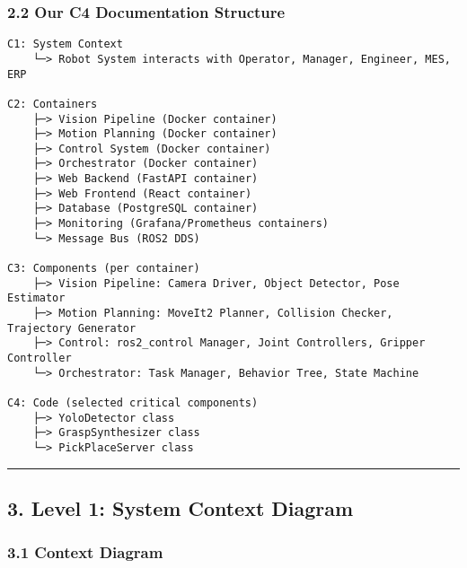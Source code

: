\documentclass[
]{article}
\begin{document}
\hypertarget{our-c4-documentation-structure}{%
\subsubsection{2.2 Our C4 Documentation
Structure}\label{our-c4-documentation-structure}}

\begin{verbatim}
C1: System Context
    └─> Robot System interacts with Operator, Manager, Engineer, MES, ERP

C2: Containers
    ├─> Vision Pipeline (Docker container)
    ├─> Motion Planning (Docker container)
    ├─> Control System (Docker container)
    ├─> Orchestrator (Docker container)
    ├─> Web Backend (FastAPI container)
    ├─> Web Frontend (React container)
    ├─> Database (PostgreSQL container)
    ├─> Monitoring (Grafana/Prometheus containers)
    └─> Message Bus (ROS2 DDS)

C3: Components (per container)
    ├─> Vision Pipeline: Camera Driver, Object Detector, Pose Estimator
    ├─> Motion Planning: MoveIt2 Planner, Collision Checker, Trajectory Generator
    ├─> Control: ros2_control Manager, Joint Controllers, Gripper Controller
    └─> Orchestrator: Task Manager, Behavior Tree, State Machine

C4: Code (selected critical components)
    ├─> YoloDetector class
    ├─> GraspSynthesizer class
    └─> PickPlaceServer class
\end{verbatim}

\begin{center}\rule{0.5\linewidth}{0.5pt}\end{center}

\hypertarget{level-1-system-context-diagram}{%
\subsection{3. Level 1: System Context
Diagram}\label{level-1-system-context-diagram}}

\hypertarget{context-diagram}{%
\subsubsection{3.1 Context Diagram}\label{context-diagram}}
\end{document}
